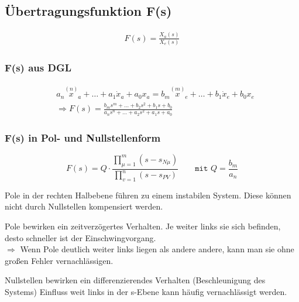 \subsection{Übertragungsfunktion F(s)}
	\begin{align*}
		F(s) = \frac{X_a(s)}{X_e(s)}
	\end{align*}

\subsubsection{F(s) aus DGL}
	
\begin{mdframed}[style=exercise]
	\begin{align*}
		& a_{n} \overset{(n)}{x}_{a}+\ldots+a_{1} \dot{x}_{a}+a_{0} x_{a} = b_{m} \overset{(m)}{x}_{e}+\ldots+b_{1} \dot{x}_{e}+b_{0} x_{e}\\
		& \Rightarrow F(s) = \frac{b_{m} s^{m}+\ldots+b_{2} s^{2}+b_{1} s+b_{0}}{a_{n} s^{n}+\ldots+a_{2} s^{2}+a_{1} s+a_{0}}
	\end{align*}
\end{mdframed}

\subsubsection{F(s) in Pol- und Nullstellenform}

\[
	F(s)=Q \cdot \frac{\prod_{\mu=1}^{m}\left(s-s_{N \mu}\right)}{\prod_{v=1}^{n}\left(s-s_{P V}\right)}
	\qquad \texttt{mit } Q = \frac{b_m}{a_n}
\]

\begin{mdframed}[style=exercise]
	Pole in der rechten Halbebene führen zu einem instabilen System. Diese können nicht durch Nullstellen kompensiert werden.

	Pole bewirken ein zeitverzögertes Verhalten. Je weiter links sie sich befinden,
	desto schneller ist der Einschwingvorgang.\\
	$\Rightarrow$ Wenn Pole deutlich weiter links liegen als andere andere, kann man sie ohne
	großen Fehler vernachlässigen.
\end{mdframed}
\begin{mdframed}[style=exercise]
	Nullstellen bewirken ein differenzierendes Verhalten (Beschleunigung des Systems)
	Einfluss weit links in der s-Ebene kann häufig vernachlässigt werden.
\end{mdframed}

